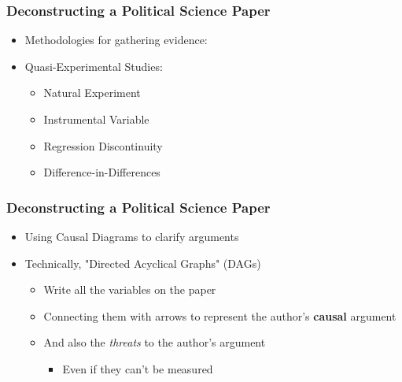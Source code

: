 \documentclass[xcolor=x11names,compress]{beamer}\usepackage[]{graphicx}\usepackage[]{color}
\renewcommand{\(}{\begin{columns}}
\renewcommand{\)}{\end{columns}}
\newcommand{\<}[1]{\begin{column}{#1}}
\renewcommand{\>}{\end{column}}
\begin{document}
\begin{frame}
\frametitle{Deconstructing a Political Science Paper}
\begin{itemize}
\item Methodologies for gathering evidence:
\item Quasi-Experimental Studies:
\begin{itemize}
\item Natural Experiment
\item Instrumental Variable
\item Regression Discontinuity
\item Difference-in-Differences
\end{itemize}
\end{itemize}
\end{frame}





\begin{frame}
\frametitle{Deconstructing a Political Science Paper}
\begin{itemize}
\item Using Causal Diagrams to clarify arguments
\item Technically, "Directed Acyclical Graphs" (DAGs)
\begin{itemize}
\item Write all the variables on the paper
\item Connecting them with arrows to represent the author's \textbf{causal} argument
\item And also the \textit{threats} to the author's argument
\begin{itemize}
\item Even if they can't be measured
\end{itemize}
\end{itemize}
\end{itemize}
\end{frame}
\end{document}
